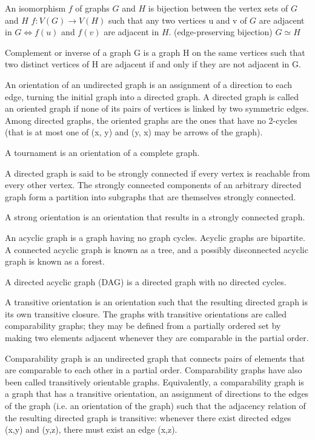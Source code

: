 \documentclass{article}
\begin{document}
An isomorphism $f$ of graphs $G$ and $H$ is bijection between the vertex sets of $G$ and $H$ $f: V(G) \rightarrow V(H)$ such that any two vertices u and v of $G$ are adjacent in $G \Leftrightarrow f(u)$ and $f(v)$ are adjacent in $H$. (edge-preserving bijection) $G \simeq H$

Complement or inverse of a graph G is a graph H on the same vertices such that two distinct vertices of H are adjacent if and only if they are not adjacent in G.

An orientation of an undirected graph is an assignment of a direction to each edge, turning the initial graph into a directed graph. A directed graph is called an oriented graph if none of its pairs of vertices is linked by two symmetric edges. Among directed graphs, the oriented graphs are the ones that have no 2-cycles (that is at most one of (x, y) and (y, x) may be arrows of the graph).

A tournament is an orientation of a complete graph.

A directed graph is said to be strongly connected if every vertex is reachable from every other vertex. The strongly connected components of an arbitrary directed graph form a partition into subgraphs that are themselves strongly connected.

A strong orientation is an orientation that results in a strongly connected graph.

An acyclic graph is a graph having no graph cycles. Acyclic graphs are bipartite. A connected acyclic graph is known as a tree, and a possibly disconnected acyclic graph is known as a forest.

A directed acyclic graph (DAG) is a directed graph with no directed cycles.

A transitive orientation is an orientation such that the resulting directed graph is its own transitive closure. The graphs with transitive orientations are called comparability graphs; they may be defined from a partially ordered set by making two elements adjacent whenever they are comparable in the partial order.

Comparability graph is an undirected graph that connects pairs of elements that are comparable to each other in a partial order. Comparability graphs have also been called transitively orientable graphs.
Equivalently, a comparability graph is a graph that has a transitive orientation, an assignment of directions to the edges of the graph (i.e. an orientation of the graph) such that the adjacency relation of the resulting directed graph is transitive: whenever there exist directed edges (x,y) and (y,z), there must exist an edge (x,z).
\end{document}
